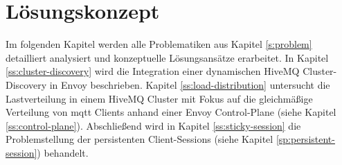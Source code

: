 \section{Lösungskonzept} \label{s:solution}
Im folgenden Kapitel werden alle Problematiken aus Kapitel \ref{s:problem} detailliert analysiert und konzeptuelle Lösungsansätze erarbeitet.
In Kapitel \ref{ss:cluster-discovery} wird die Integration einer dynamischen HiveMQ Cluster-Discovery in Envoy beschrieben.
Kapitel \ref{ss:load-distribution} untersucht die Lastverteilung in einem HiveMQ Cluster mit Fokus auf die gleichmä{\ss}ige Verteilung von \ac{mqtt} Clients anhand einer Envoy Control-Plane (siehe Kapitel \ref{ss:control-plane}).
Abschlie{\ss}end wird in Kapitel \ref{ss:sticky-session} die Problemstellung der persistenten Client-Sessions (siehe Kapitel \ref{sp:persistent-session}) behandelt.


